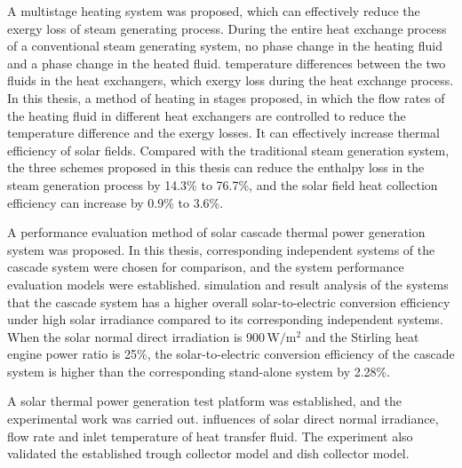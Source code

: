 {\begin{spacing}{1.4}
A multistage heating system was proposed, which can effectively reduce the exergy loss of steam generating process. During the entire heat exchange process of a conventional steam generating system, no phase change  in the heating fluid and a phase change  in the heated fluid.  temperature differences  between the two fluids in the heat exchangers, which  exergy loss during the heat exchange process. In this thesis, a method of heating in stages  proposed, in which the flow rates of the heating fluid in different heat exchangers are controlled to reduce the temperature difference and the exergy losses. It can effectively increase thermal efficiency of solar fields. Compared with the traditional steam generation system, the three schemes proposed in this thesis can reduce the enthalpy loss in the steam generation process by 14.3\% to 76.7\%, and the solar field heat collection efficiency can increase by 0.9\% to 3.6\%.

A performance evaluation method of solar cascade thermal power generation system was proposed. In this thesis, corresponding independent systems of the cascade system were chosen for comparison, and the system performance evaluation models were established.  simulation and result analysis of the systems that the cascade system has a higher overall solar-to-electric conversion efficiency under high solar irradiance compared to its corresponding independent systems. When the solar normal direct irradiation is 900$\,\mathrm{W/m^2}$ and the Stirling heat engine power ratio is 25\%, the solar-to-electric conversion efficiency of the cascade system is higher than the corresponding stand-alone system by 2.28\%.

A solar thermal power generation test platform was established, and the experimental work was carried out.  influences of solar direct normal irradiance, flow rate and inlet temperature of heat transfer fluid.
The experiment also validated the established trough collector model and dish collector model.


\end{spacing}}
